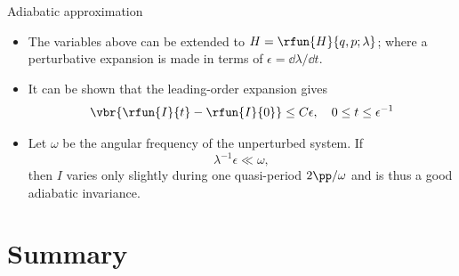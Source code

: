 \documentclass{beamer}
\begin{document}
\begin{frame}{Adiabatic approximation}
\begin{itemize}
\item The variables above can be extended to $H = \rfun{H}{q, p; \lambda}$; 
where a perturbative expansion is made in terms of $\epsilon = \dd \lambda / \dd 
t$.
\item It can be shown that the leading-order expansion gives
\begin{equation}
\vbr{\rfun{I}{t} - \rfun{I}{0}} \le C \epsilon,\quad 0 \le t \le \epsilon^{-1}
\end{equation}
\item Let $\omega$ be the angular frequency of the unperturbed system. If
\begin{equation}
\lambda^{-1} \epsilon \ll \omega,
\end{equation}
then $I$ varies only slightly during one quasi-period $2\pp/\omega$ and is 
thus a good \alert{adiabatic invariance}.

\end{itemize}

\end{frame}



\section*{Summary}
\end{document}
